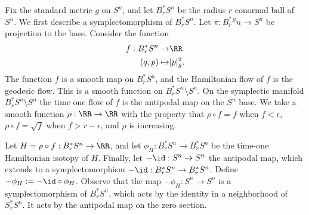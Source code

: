

    Fix the standard metric $g$ on $S^n$, and let $B_r^*S^{n}$ be the radius  $r$ conormal ball of $S^n$. 
    We first describe a symplectomorphism of $B_r^*S^n$. Let $\pi: B^*_r^Sn\to S^n$ be projection to the base.
    Consider the function 
    \begin{align*}
        f: B_r^*S^{n}\to& \RR\\
        (q, p) \mapsto& |p|_g^2.
    \end{align*}
    The function $f$ is a smooth map on $B_r^*S^n$, and the Hamiltonian flow of $f$ is the geodesic flow. 
    This is a smooth function on $B^*_rS^n\setminus S^n$. 
    On the symplectic manifold $B^*_rS^n\setminus S^n$ the time one flow of $f$ is the antipodal map on the $S^n$ base. 
    We take a smooth function $\rho: \RR\to \RR$ with the property that $\rho \circ f = f$ when $f< \epsilon$, $\rho\circ f=\sqrt f$ when $f>r-\epsilon$, and $\rho$ is increasing. 

    
    
    Let $H= \rho \circ f: B^*_rS^n\to \RR$, and let $\phi_H: B_r^*S^n\to B_r^*S^n$ be the time-one Hamiltonian isotopy of $H$. 
    Finally, let $-\id: S^n\to S^n$ the antipodal map, which extends to a symplectomorphism $-\id: B_r^*S^n\to B_r^*S^n$. 
    Define $-\phi_H:=-\id\circ \phi_H$. 
    Observe that the map $-\phi_H: S^n\to S^n$ is a symplectomorphism of $B_r^*{S^n}$, which acts by the identity in a neighborhood of $S_r^*S^{n}$.
    It acts by the antipodal map on the zero section.
